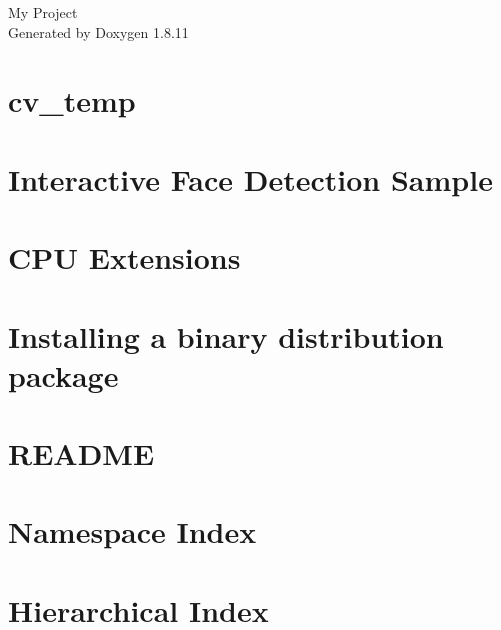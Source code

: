 \documentclass[twoside]{book}
\newcommand{\+}{\discretionary{\mbox{\scriptsize$\hookleftarrow$}}{}{}}
\newcommand{\clearemptydoublepage}{%
  \newpage{\pagestyle{empty}\cleardoublepage}%
}
\begin{document}
\hypersetup{pageanchor=false,
             bookmarksnumbered=true,
             pdfencoding=unicode
            }
\begin{titlepage}
\vspace*{7cm}
\begin{center}%
{\Large My Project }\\
\vspace*{1cm}
{\large Generated by Doxygen 1.8.11}\\
\end{center}
\end{titlepage}
\clearemptydoublepage
\tableofcontents
\clearemptydoublepage
{}
\hypersetup{pageanchor=true}

\chapter{cv\+\_\+temp}
\label{md_README}
\hypertarget{md_README}{}

\chapter{Interactive Face Detection Sample}
\label{InferenceEngineInteractiveFaceDetectionSampleApplication}
\hypertarget{InferenceEngineInteractiveFaceDetectionSampleApplication}{}

\chapter{C\+PU Extensions}
\label{CPUExtensions}
\hypertarget{CPUExtensions}{}

\chapter{Installing a binary distribution package}
\label{md_thirdparty_gflags_INSTALL}
\hypertarget{md_thirdparty_gflags_INSTALL}{}

\chapter{R\+E\+A\+D\+ME}
\label{md_thirdparty_gflags_README}
\hypertarget{md_thirdparty_gflags_README}{}

\chapter{Namespace Index}

\chapter{Hierarchical Index}

\end{document}
